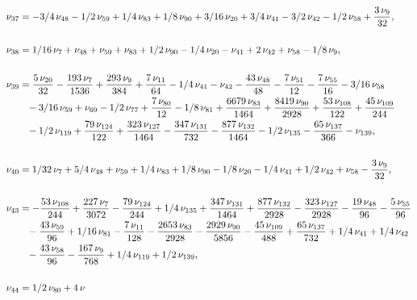 \documentclass[a4paper,12pt, DIV=14, BCOR=5mm, twoside, headsepline, numbers=noenddot]{scrbook}
\begin{document}
\begin{align}\label{AreaSol5}
\begin{aligned}
\nu_
{{37}}&=-3/4\,\nu_{{48}}-1/2\,\nu_{{59}}+1/4\,\nu_{{83}}+1/8\,\nu_{{90}
}+3/16\,\nu_{{20}}+3/4\,\nu_{{41}}-3/2\,\nu_{{42}}-1/2\,\nu_{{58}}+{
\frac {3\,\nu_{{9}}}{32}}, \\
\\
\nu_{{38}}&=1/16\,\nu_{{7}}+\nu_{{48}}+\nu_{{
59}}+\nu_{{83}}+1/2\,\nu_{{90}}-1/4\,\nu_{{20}}-\nu_{{41}}+2\,\nu_{{42
}}+\nu_{{58}}-1/8\,\nu_{{9}}, \\
\\
\nu_{{39}}&={\frac {5\,\nu_{{20}}}{32}}-{
\frac {193\,\nu_{{7}}}{1536}}+{\frac {293\,\nu_{{9}}}{384}}+{\frac {7
\,\nu_{{11}}}{64}}-1/4\,\nu_{{41}}-\nu_{{42}}-{\frac {43\,\nu_{{48}}}{
48}}-{\frac {7\,\nu_{{51}}}{12}}-{\frac {7\,\nu_{{55}}}{16}}-3/16\,\nu
_{{58}}\\
 &\hphantom{=}-3/16\,\nu_{{59}}+\nu_{{69}}-1/2\,\nu_{{77}}+{\frac {7\,\nu_{{
80}}}{12}}-1/8\,\nu_{{81}}+{\frac {6679\,\nu_{{83}}}{1464}}+{\frac {
8419\,\nu_{{90}}}{2928}}+{\frac {53\,\nu_{{108}}}{122}}+{\frac {45\,
\nu_{{109}}}{244}}\\
 &\hphantom{=}-1/2\,\nu_{{119}}+{\frac {79\,\nu_{{124}}}{122}}+{
\frac {323\,\nu_{{127}}}{1464}}-{\frac {347\,\nu_{{131}}}{732}}-{
\frac {877\,\nu_{{132}}}{1464}}-1/2\,\nu_{{135}}-{\frac {65\,\nu_{{137
}}}{366}}-\nu_{{139}}, \\
\\
\nu_{{40}}&=1/32\,\nu_{{7}}+5/4\,\nu_{{48}}+\nu_{
{59}}+1/4\,\nu_{{83}}+1/8\,\nu_{{90}}-1/8\,\nu_{{20}}-1/4\,\nu_{{41}}+
1/2\,\nu_{{42}}+\nu_{{58}}-{\frac {3\,\nu_{{9}}}{32}}, \\
\\
\nu_{{43}}&=-{
\frac {53\,\nu_{{108}}}{244}}+{\frac {227\,\nu_{{7}}}{3072}}-{\frac {
79\,\nu_{{124}}}{244}}+1/4\,\nu_{{135}}+{\frac {347\,\nu_{{131}}}{1464
}}+{\frac {877\,\nu_{{132}}}{2928}}-{\frac {323\,\nu_{{127}}}{2928}}-{
\frac {19\,\nu_{{48}}}{96}}-{\frac {5\,\nu_{{55}}}{96}}\\
 &\hphantom{=}-{\frac {43\,
\nu_{{59}}}{96}}+1/16\,\nu_{{81}}-{\frac {7\,\nu_{{11}}}{128}}-{\frac 
{2653\,\nu_{{83}}}{2928}}-{\frac {2929\,\nu_{{90}}}{5856}}-{\frac {45
\,\nu_{{109}}}{488}}+{\frac {65\,\nu_{{137}}}{732}}+1/4\,\nu_{{41}}+1/
4\,\nu_{{42}}\\
 &\hphantom{=}-{\frac {43\,\nu_{{58}}}{96}}-{\frac {167\,\nu_{{9}}}{768
}}+1/4\,\nu_{{119}}+1/2\,\nu_{{139}},\\
\\
\nu_{{44}}&=1/2\,\nu_{{80}}+4\,\nu

\end{aligned}
\end{align}
\end{document}
